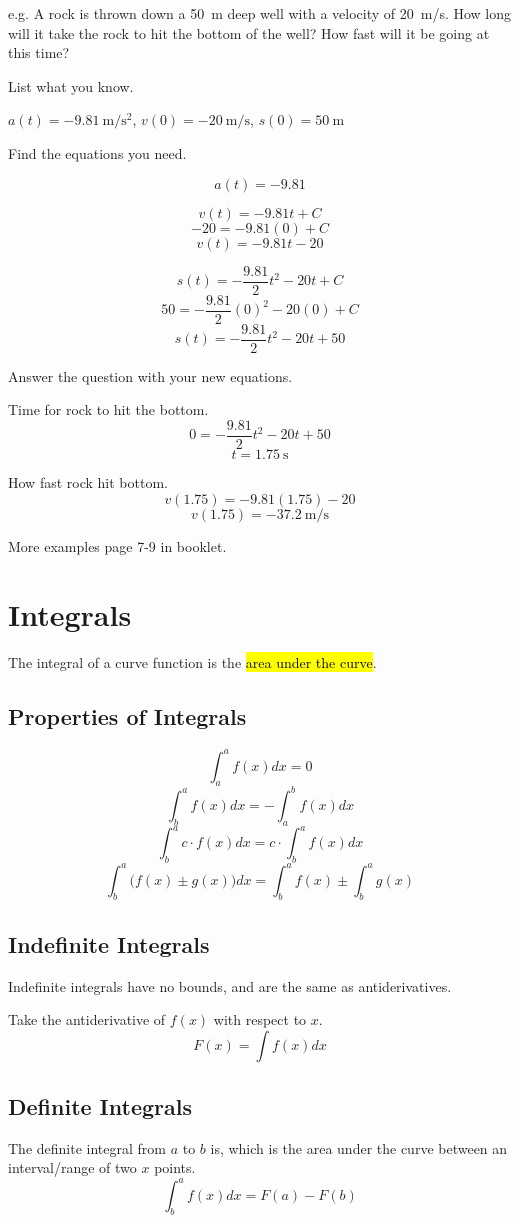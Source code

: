 \documentclass[a4paper,12pt]{article}
\begin{document}
\pagebreak

e.g. A rock is thrown down a \SI{50}{\m} deep well with a velocity of \SI{20}{\m/\s}. How long will it take the rock to hit the bottom of the well? How fast will it be going at this time?

List what you know.

$a(t) = \SI{-9.81}{\m/\s^2}$, $v(0) = \SI{-20}{\m/\s}$, $s(0) = \SI{50}{\m}$

Find the equations you need.

$$a(t) = -9.81$$

$$v(t) = -9.81t + C$$
$$-20 = -9.81(0) + C$$
$$v(t) = -9.81t - 20$$

$$s(t) = -\frac{9.81}{2}t^2 - 20t + C$$
$$50 = -\frac{9.81}{2}(0)^2 - 20(0) + C$$
$$s(t) = -\frac{9.81}{2}t^2 - 20t + 50$$

Answer the question with your new equations.

Time for rock to hit the bottom.
$$0 = -\frac{9.81}{2}t^2 - 20t + 50$$
$$t = \SI{1.75}{\s}$$

How fast rock hit bottom.
$$v(1.75) = -9.81(1.75) - 20$$
$$v(1.75) = \SI{-37.2}{\m/\s}$$

More examples page 7-9 in booklet.

\pagebreak

\section{Integrals}
The integral of a curve function is the \hl{area under the curve}.

\subsection{Properties of Integrals}
$$\int_a^a{f(x)}dx = 0$$
$$\int^a_b{f(x)}dx = -\int^b_a{f(x)}dx$$
$$\int^a_b{c \cdot f(x)}dx = c\cdot\int^a_b{f(x)}dx$$
$$\int^a_b{\Big( f(x) \pm g(x) \Big)}dx = \int^a_b{f(x)} \pm \int^a_b{g(x)}$$

\subsection{Indefinite Integrals}
Indefinite integrals have no bounds, and are the same as antiderivatives.

Take the antiderivative of $f(x)$ with respect to $x$.
$$F(x) = \int{f(x)}dx$$

\subsection{Definite Integrals}
The definite integral from $a$ to $b$ is, which is the area under the curve between an interval/range of two $x$ points.
$$\int^a_b{f(x)}dx = F(a) - F(b)$$
\end{document}
